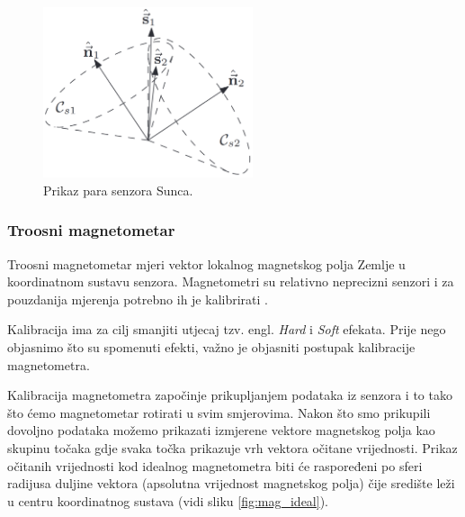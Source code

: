 \documentclass[times, utf8, diplomski, numeric]{templates/template}
\begin{document}
{{{{                \begin{figure}[htb]
                \centering
                \includegraphics[width=0.55\textwidth]{images/sensor_sunca_sensor_fusion.png}
                \caption{Prikaz para senzora Sunca.}
                \label{fig:sensor_sunca_sensor_fusion}
                \end{figure}
            }

            \subsubsection{Troosni magnetometar}{
            \label{subsubsection:troosni_magnetometar}
                Troosni magnetometar mjeri vektor lokalnog magnetskog polja Zemlje u koordinatnom sustavu senzora. Magnetometri su relativno neprecizni senzori i za pouzdanija mjerenja potrebno ih je kalibrirati \cite{adcsKnjiga}.

                Kalibracija ima za cilj smanjiti utjecaj tzv. engl. \emph{Hard} i \emph{Soft} efekata. Prije nego objasnimo što su spomenuti efekti, važno je objasniti postupak kalibracije magnetometra. 

                Kalibracija magnetometra započinje prikupljanjem podataka iz senzora i to tako što ćemo magnetometar rotirati u svim smjerovima. Nakon što smo prikupili dovoljno podataka možemo prikazati izmjerene vektore magnetskog polja kao skupinu točaka gdje svaka točka prikazuje vrh vektora očitane vrijednosti. Prikaz očitanih vrijednosti kod idealnog magnetometra biti će raspoređeni po sferi radijusa duljine vektora (apsolutna vrijednost magnetskog polja) čije središte leži u centru koordinatnog sustava (vidi sliku \ref{fig:mag_ideal}).

}}}}
\end{document}
